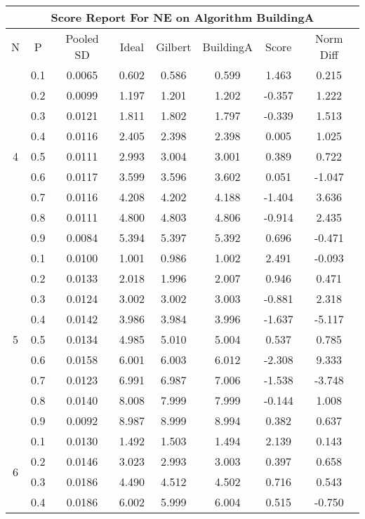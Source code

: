 \documentclass[11pt,a4paper]{report}
\begin{document}
\begin{longtable}{ | c | c || c | c | c | c | c | c | }
\hline
\multicolumn{8}{|c|}{ Score Report For NE on Algorithm BuildingA} \\
\hline
N & P & Pooled SD &  Ideal &  Gilbert & BuildingA  & Score & Norm Diff \\
 \hline
 \hline
 \endhead
\multirow{9}{*}{4} & 0.1 & 0.0065 & 0.602 & 0.586 & 0.599 & 1.463 & 0.215 \\
 & 0.2 & 0.0099 & 1.197 & 1.201 & 1.202 & -0.357 & 1.222 \\
 & 0.3 & 0.0121 & 1.811 & 1.802 & 1.797 & -0.339 & 1.513 \\
 & 0.4 & 0.0116 & 2.405 & 2.398 & 2.398 & 0.005 & 1.025 \\
 & 0.5 & 0.0111 & 2.993 & 3.004 & 3.001 & 0.389 & 0.722 \\
 & 0.6 & 0.0117 & 3.599 & 3.596 & 3.602 & 0.051 & -1.047 \\
 & 0.7 & 0.0116 & 4.208 & 4.202 & 4.188 & -1.404 & 3.636 \\
 & 0.8 & 0.0111 & 4.800 & 4.803 & 4.806 & -0.914 & 2.435 \\
 & 0.9 & 0.0084 & 5.394 & 5.397 & 5.392 & 0.696 & -0.471 \\
 \hline
\multirow{9}{*}{5} & 0.1 & 0.0100 & 1.001 & 0.986 & 1.002 & 2.491 & -0.093 \\
 & 0.2 & 0.0133 & 2.018 & 1.996 & 2.007 & 0.946 & 0.471 \\
 & 0.3 & 0.0124 & 3.002 & 3.002 & 3.003 & -0.881 & 2.318 \\
 & 0.4 & 0.0142 & 3.986 & 3.984 & 3.996 & -1.637 & -5.117 \\
 & 0.5 & 0.0134 & 4.985 & 5.010 & 5.004 & 0.537 & 0.785 \\
 & 0.6 & 0.0158 & 6.001 & 6.003 & 6.012 & -2.308 & 9.333 \\
 & 0.7 & 0.0123 & 6.991 & 6.987 & 7.006 & -1.538 & -3.748 \\
 & 0.8 & 0.0140 & 8.008 & 7.999 & 7.999 & -0.144 & 1.008 \\
 & 0.9 & 0.0092 & 8.987 & 8.999 & 8.994 & 0.382 & 0.637 \\
 \hline
\multirow{9}{*}{6} & 0.1 & 0.0130 & 1.492 & 1.503 & 1.494 & 2.139 & 0.143 \\
 & 0.2 & 0.0146 & 3.023 & 2.993 & 3.003 & 0.397 & 0.658 \\
 & 0.3 & 0.0186 & 4.490 & 4.512 & 4.502 & 0.716 & 0.543 \\
 & 0.4 & 0.0186 & 6.002 & 5.999 & 6.004 & 0.515 & -0.750 \\

\end{longtable}
\end{document}

